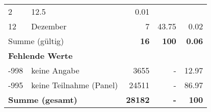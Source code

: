 \begin{longtable}{lXrrr}
       \num{2} &
       \num[round-mode=places,round-precision=2]{12.5} &
         \num[round-mode=places,round-precision=2]{0.01} \\

     12 &
     \multicolumn{1}{X}{ Dezember   } &


       \num{7} &
       \num[round-mode=places,round-precision=2]{43.75} &
         \num[round-mode=places,round-precision=2]{0.02} \\
     \midrule
     \multicolumn{2}{l}{Summe (gültig)} &
       \textbf{\num{16}} &
     \textbf{\num{100}} &
       \textbf{\num[round-mode=places,round-precision=2]{0.06}} \\
     \multicolumn{5}{l}{\textbf{Fehlende Werte}}\\
       -998 &
       keine Angabe &
         \num{3655} &
        - &
         \num[round-mode=places,round-precision=2]{12.97} \\
       -995 &
       keine Teilnahme (Panel) &
         \num{24511} &
        - &
         \num[round-mode=places,round-precision=2]{86.97} \\
     \midrule
     \multicolumn{2}{l}{\textbf{Summe (gesamt)}} &
          \textbf{\num{28182}} &
        \textbf{-} &
        \textbf{\num{100}} \\
     \bottomrule
     \end{longtable}
     
